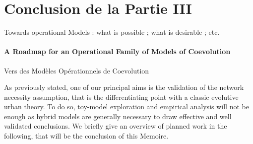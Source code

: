 





\chapter*{Conclusion de la Partie III}










Towards operational Models : what is possible ; what is desirable ; etc.


\subsubsection*{A Roadmap for an Operational Family of Models of Coevolution}{Vers des Modèles Opérationnels de Coevolution} %


As previously stated, one of our principal aims is the validation of the network necessity assumption, that is the differentiating point with a classic evolutive urban theory. To do so, toy-model exploration and empirical analysis will not be enough as hybrid models are generally necessary to draw effective and well validated conclusions. We briefly give an overview of planned work in the following, that will be the conclusion of this Memoire.












